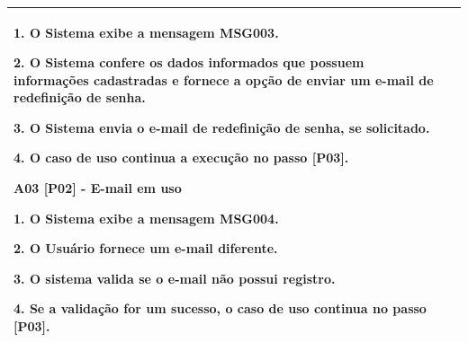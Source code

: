 \begin{quadro}[!htbp]
\begin{tabular}{  m{4cm}  m{11cm} }
        1. O Sistema exibe a mensagem MSG003.
        
        2. O Sistema confere os dados informados que possuem informações cadastradas e fornece a opção de enviar um e-mail de redefinição de senha.
        
        3. O Sistema envia o e-mail de redefinição de senha, se solicitado.
        
        4. O caso de uso continua a execução no passo [P03].
        
        \textbf {A03 [P02] - E-mail em uso}
        
        1. O Sistema exibe a mensagem MSG004.
        
        2. O Usuário fornece um e-mail diferente.
        
        3. O sistema valida se o e-mail não possui registro.
        
        4. Se a validação for um sucesso, o caso de uso continua no passo [P03].  \\ \hline  
	\end{tabular}
\end{quadro}


